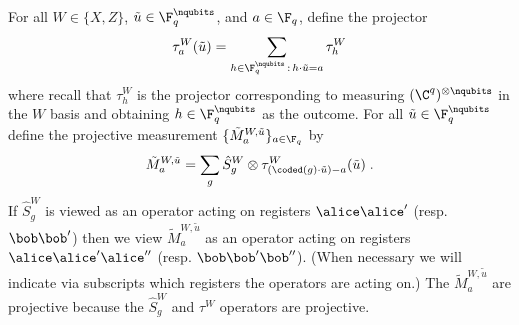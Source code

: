 For all $W \in \{X, Z\}$, $\tilde{u} \in \F_q^{\nqubits}$, and $a \in \F_q$, define the projector
\begin{equation}\label{eq:def-tauwu}
 \tau^{W}_{a}(\tilde{u}) = \sum_{h \in \F_q^{\nqubits} \,:\, h \cdot \tilde{u} = a} \tau^W_{h}
\end{equation}
where recall that $\tau^W_h$ is the projector corresponding to measuring $(\C^q)^{\otimes \nqubits}$ in the $W$ basis and obtaining $h \in \F_q^\nqubits$ as the outcome. For all $\tilde{u} \in \F_q^\nqubits$ define the projective measurement $\{ \tilde{M}^{W,\tilde{u}}_a \}_{a \in \F_q}$ by 
	\begin{equation}
	\label{eq:tilde_M}
	\tilde{M}^{W,\tilde{u}}_a =  \sum_{g} \hat{S}^W_g \otimes \tau_{(\coded(g) \cdot \tilde{u}) - a}^W(\tilde{u})\;.
	\end{equation}
	If $\hat{S}^W_g$ is viewed as an operator acting on registers $\alice \alice'$ (resp. $\bob \bob'$) then we view $\tilde{M}^{W,\tilde{u}}_a$ as an operator acting on registers $\alice \alice' \alice''$ (resp. $\bob \bob' \bob''$). (When necessary we will indicate via subscripts which registers the operators are acting on.)
The $\tilde{M}^{W,\tilde{u}}_a$ are projective because the $\hat{S}^W_g$ and $\tau^W$ operators are projective.


